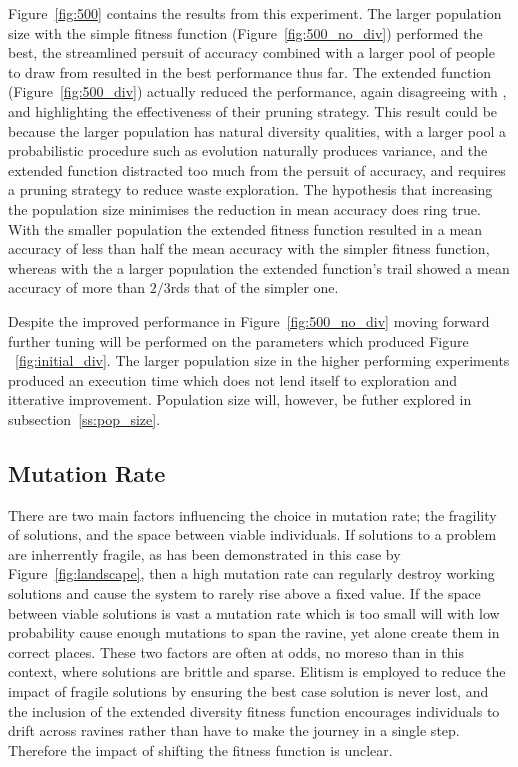 Figure~\ref{fig:500} contains the results from this experiment. The larger
population size with the simple fitness function (Figure~\ref{fig:500_no_div})
performed the best, the
streamlined persuit of accuracy combined with a larger pool of people to
draw from resulted in the best performance thus far.  The extended function
(Figure~\ref{fig:500_div})
actually reduced the performance, again disagreeing with
\cite{deJong:2001:RBP:2955239.2955241}, and highlighting the
effectiveness of their pruning strategy. This result could be because
the larger population has natural diversity qualities, with a larger pool
a probabilistic procedure such as evolution naturally produces variance,
and the extended
function distracted too much from the persuit of accuracy, and requires a pruning
strategy to reduce waste exploration. The hypothesis
that increasing the population size minimises the reduction in mean accuracy
does ring true. With the smaller population the extended fitness function resulted in
a mean accuracy of less than half the mean accuracy with the simpler fitness function,
whereas
with the a larger population the extended function's trail showed a mean accuracy of
more than
$2/3$rds that of the simpler one.

Despite the improved performance in Figure~\ref{fig:500_no_div} moving forward
further tuning will be performed on the parameters which produced Figure
~\ref{fig:initial_div}. The larger population size in the higher performing experiments
produced an execution time which does not lend itself to exploration and
itterative improvement. Population size will, however, be futher explored in
subsection~\ref{ss:pop_size}.

\subsection{Mutation Rate}

There are two main factors influencing the choice in mutation rate; the fragility
of solutions, and the space between viable individuals. If solutions to a problem are
inherrently fragile, as has been demonstrated in this case by Figure~\ref{fig:landscape},
then a high
mutation rate can regularly destroy working solutions and cause the system to
rarely rise above a fixed value. If the space between viable solutions is vast
a mutation rate which is too small will with low probability cause enough mutations to
span the ravine, yet alone create them in correct places. These two factors are
often at odds, no moreso than in this context, where solutions are brittle and
sparse. Elitism is employed to reduce the impact of fragile solutions by ensuring
the best case solution is never lost, and the inclusion of the extended diversity
fitness function encourages individuals to drift across ravines rather than have
to make the journey in a single step. Therefore the impact of shifting the
fitness function is unclear.

